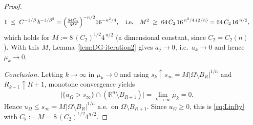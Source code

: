 \documentclass[11pt]{amsart}
\theoremstyle{definition}
\newcommand{\R}{\mathbb R}
\newcommand{\Om}{\Omega}
\newcommand{\abs}[1]{\left|#1\right|}
\begin{document}
\begin{proof}
\[
   1\;\le\;C^{-1/\beta}\,b^{-1/\beta^2}
   =\Bigl(\tfrac{64C_2}{M^2}\Bigr)^{-n/2}16^{-n^2/4},
   \quad\text{i.e.}\quad
   M^2\;\ge\;64\,C_2\,16^{\,n^2/4\cdot(2/n)}=64\,C_2\,16^{\,n/2},
\]
which holds for $M:=8\,(C_2)^{1/2}4^{\,n/2}$ (a dimensional constant,
since $C_2=C_2(n)$). With this $M$, Lemma~\ref{lem:DG-iteration2} gives
$\widetilde a_j\to0$, i.e.\ $a_k\to0$ and hence $\mu_k\to0$.

\smallskip
\emph{Conclusion.} Letting $k\to\infty$ in $\mu_k\to0$ and using
$s_k\uparrow s_\infty=M\abs{\Om\setminus B_R}^{1/n}$ and
$R_{k-1}\uparrow R+1$, monotone convergence yields
\[
   \bigl|\{u_\Om>s_\infty\}\cap(\R^n\setminus B_{R+1})\bigr|
   =\lim_{k\to\infty}\mu_k=0 .
\]
Hence $u_\Om\le s_\infty=M\abs{\Om\setminus B_R}^{1/n}$ a.e.\ on
$\Om\setminus B_{R+1}$. Since $u_\Om\ge0$, this is
\eqref{eq:Linfty} with $C_\flat:=M=8\,(C_2)^{1/2}4^{n/2}$.
\end{proof}
\end{document}
